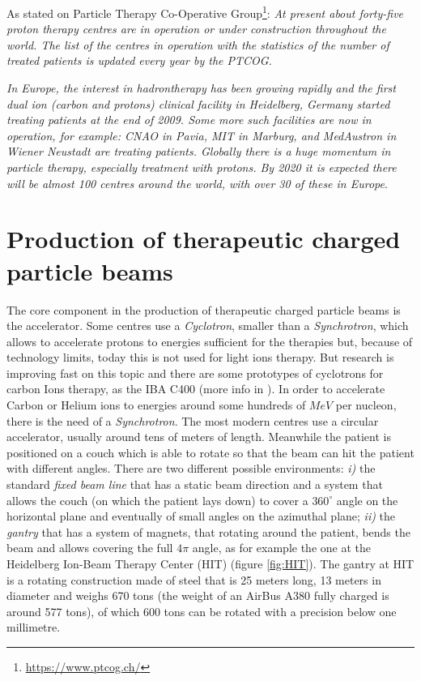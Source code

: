 \documentclass[12pt, a4paper, twoside]{book}
\begin{document}
As stated on Particle Therapy Co-Operative Group\footnote{\url{https://www.ptcog.ch/}}: \emph{At present about forty-five proton therapy centres are in operation or under construction throughout the world. The list of the centres in operation with the statistics of the number of treated patients is updated every year by the PTCOG.}

\emph{In Europe, the interest in hadrontherapy has been growing rapidly and the first dual ion (carbon and protons) clinical facility in Heidelberg, Germany started treating patients at the end of 2009. Some more such facilities are now in operation, for example: CNAO in Pavia, MIT in Marburg, and MedAustron in Wiener Neustadt are treating patients.
Globally there is a huge momentum in particle therapy, especially treatment with protons. By 2020 it is expected there will be almost 100 centres around the world, with over 30 of these in Europe}.


\section{Production of therapeutic charged particle beams}
The core component in the production of therapeutic charged particle beams is the accelerator. Some centres use a \emph{Cyclotron}, smaller than a \emph{Synchrotron}, which allows to accelerate protons to energies sufficient for the therapies but, because of technology limits, today this is not used for light ions therapy. But research is improving fast on this topic and there are some prototypes of cyclotrons for carbon Ions therapy, as the IBA C400 (more info in \cite{jong:iba}). In order to accelerate Carbon or Helium ions to energies around some hundreds of $MeV$ per nucleon, there is the need of a \emph{Synchrotron}. The most modern centres use a circular accelerator, usually around tens of meters of length. Meanwhile the patient is positioned on a couch which is able to rotate so that the beam can hit the patient with different angles. There are two different possible environments: \emph{i)} the standard \emph{fixed beam line} that has a static beam direction and a system that allows the couch (on which the patient lays down) to cover a $360^\circ$ angle on the horizontal plane and eventually of small angles on the azimuthal plane; \emph{ii)} the \emph{gantry} that has a system of magnets, that rotating around the patient, bends the beam and allows covering the full $4\pi$ angle, as for example the one at the Heidelberg Ion-Beam Therapy Center (HIT) (figure \ref{fig:HIT}). The gantry at HIT is a rotating construction made of steel that is 25 meters long, 13 meters in diameter and weighs 670 tons (the weight of an AirBus A380 fully charged is around 577 tons), of which 600 tons can be rotated with a precision below one millimetre. 
\end{document}
